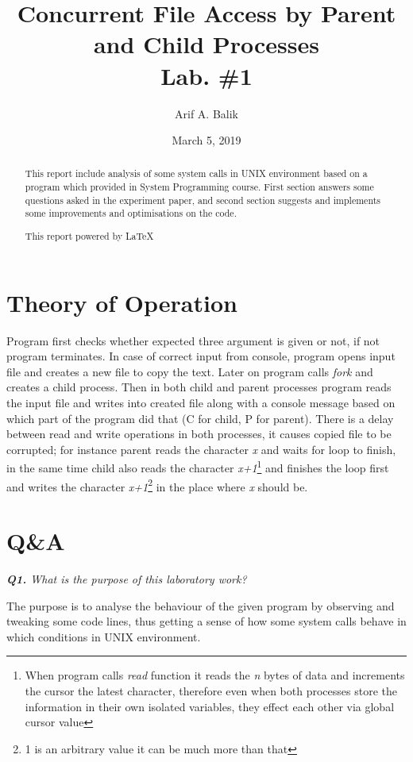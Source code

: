 \documentclass[11pt]{article}
\title{Concurrent File Access by Parent and Child Processes \\Lab. \#1}
\author{Arif A. Balik}
\affil{Undergraduate Student\\
	Sytstem Programming\\
	Department of Computer Science\\
	Arel University\\
	Büyükçekmece, İstanbul 34537\\
    Email: arifbalik@outlook.com
}
\date{March 5, 2019}                                           %
\begin{document}
\maketitle

\begin{abstract}
This report include analysis of some system calls in UNIX environment based on a program which provided in System Programming course. First section answers some questions asked in the experiment paper, and second section suggests and implements some improvements and optimisations on the code.

This report powered by \LaTeX{}
\end{abstract}

\section*{Theory of Operation}
Program first checks whether expected three argument is given or not, if not program terminates. In case of correct input from console, program opens input file and creates a new file to copy the text. Later on program calls \textit{fork} and creates a child process. Then in both child and parent processes program reads the input file and writes into created file along with a console message based on which part of the program did that (C for child, P for parent). There is a delay between read and write operations in both processes, it causes copied file to be corrupted; for instance parent reads the character \textit{x} and waits for loop to finish, in the same time child also reads the character \textit{x+1}\footnote{When program calls \textit{read} function it reads the \textit{n} bytes of data and increments the cursor the latest character, therefore even when both processes store the information in their own isolated variables, they effect each other via global cursor value} and finishes the loop first and writes the character \textit{x+1}\footnote{1 is an arbitrary value it can be much more than that} in the place where \textit{x} should be.
\section*{Q\&A}

\textit{\textbf{Q1.} What is the purpose of this laboratory work?}
\vspace{3mm}

The purpose is to analyse the behaviour of the given program by observing and tweaking some code lines, thus getting a sense of how some system calls behave in which conditions in UNIX environment.
\end{document}
